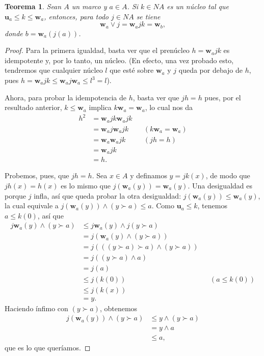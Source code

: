 \documentclass[12pt,letterpaper,titlepage]{article}
\newtheorem{thm}{Teorema}
\theoremstyle{definition}
\renewcommand\sup{\vee}
\renewcommand\inf{\wedge}
\newcommand\unuc[1]{\mathbf u_{#1}}
\newcommand\wnuc[1]{\mathbf w_{#1}}
\newcommand\<{\langle}
\renewcommand\>{\rangle}
\begin{document}
\begin{thm}
    Sean $A$ un marco y $a\in A$.
    Si $k\in NA$ es un núcleo tal que $\unuc a\leq k\leq\wnuc a$,
    entonces, para todo $j\in NA$ se tiene
    \[
        \wnuc a\sup j = \wnuc a j k = \wnuc b
    ,\]
    donde $b=\wnuc a(j(a))$.
\end{thm}
\begin{proof}
    Para la primera igualdad,
    basta ver que el prenúcleo $h=\wnuc ajk$ es idempotente
    y, por lo tanto, un núcleo.
    (En efecto, una vez probado esto, tendremos que
    cualquier núcleo $l$ que esté sobre $\wnuc a$ y $j$ queda
    por debajo de $h$, pues
    $h=\wnuc ajk\leq\wnuc aj\wnuc a\leq l^3=l$).
    
    Ahora, para probar la idempotencia de $h$,
    basta ver que $jh=h$ pues,
    por el resultado anterior,
    $k\leq\wnuc a$ implica $k\wnuc a=\wnuc a$,
    lo cual nos da
    \begin{align*}
        h^2
        &= \wnuc ajk\wnuc ajk \\ 
        &= \wnuc aj\wnuc ajk
            && (k\wnuc a=\wnuc a) \\ 
        &= \wnuc a\wnuc ajk
            && (jh=h)\\ 
        &= \wnuc ajk \\ 
        &= h.
    \end{align*}
    
    Probemos, pues, que $jh=h$.
    Sea $x\in A$ y definamos $y=jk(x)$,
    de modo que $jh(x)=h(x)$ es lo mismo que
    $j(\wnuc a(y))=\wnuc a(y)$.
    Una desigualdad es porque $j$ infla,
    así que queda probar la otra desigualdad:
    $j(\wnuc a(y))\leq\wnuc a(y)$,
    la cual equivale a $j(\wnuc a(y))\inf(y\succ a)\leq a$.
    Como $\unuc a\leq k$, tenemos $a\leq k(0)$, así que
    \begin{align*}
        j\wnuc a(y)\inf(y\succ a)
        &\leq j\wnuc a(y)\inf j(y\succ a) \\
        &= j(\wnuc a(y)\inf (y\succ a)) \\
        &= j(((y\succ a)\succ a)\inf (y\succ a)) \\
        &= j((y\succ a)\inf a) \\
        &= j(a) \\
        &\leq j(k(0)) && (a\leq k(0)) \\
        &\leq j(k(x)) \\
        &= y.
    \end{align*}
    Haciendo ínfimo con $(y\succ a)$, obtenemos
    \begin{align*}
        j(\wnuc a(y))\inf (y\succ a)
        &\leq y\inf (y\succ a) \\
        &= y\inf a \\
        &\leq a,
    \end{align*}
    que es lo que queríamos.
    

\end{proof}
\end{document}
